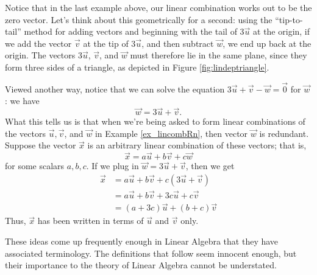 \medskip

Notice that in the last example above, our linear combination works out to be the zero vector. Let's think about this geometrically for a second: using the ``tip-to-tail'' method for adding vectors and beginning with the tail of $3\vec{u}$ at the origin, if we add the vector $\vec{v}$ at the tip of $3\vec{u}$, and then subtract $\vec{w}$, we end up back at the origin. The vectors $3\vec{u}$, $\vec{v}$, and $\vec{w}$ must therefore lie in the same plane, since they form three sides of a triangle, as depicted in Figure \ref{fig:lindeptriangle}.


Viewed another way, notice that we can solve the equation $3\vec{u}+\vec{v}-\vec{w}=\vec{0}$ for $\vec{w}$: we have
\[
\vec{w} = 3\vec{u}+\vec{v}.
\]
What this tells us is that when we're being asked to form linear combinations of the vectors $\vec{u}, \vec{v}$, and $\vec{w}$ in Example \ref{ex_lincombRn}, then vector $\vec{w}$ is redundant. Suppose the vector $\vec{x}$ is an arbitrary linear combination of these vectors; that is,
\[
\vec{x} = a\vec{u}+b\vec{v}+c\vec{w}
\]
for some scalars $a,b,c$. If we plug in $\vec{w} = 3\vec{u}+\vec{v}$, then we get
\begin{align*}
\vec{x} &= a\vec{u}+b\vec{v}+c(3\vec{u}+\vec{v})\\
& = a\vec{u}+b\vec{v}+3c\vec{u}+c\vec{v} \tag*{distribute the scalar}\\
& = (a+3c)\vec{u} + (b+c)\vec{v} \tag*{collect terms.}
\end{align*}
Thus, $\vec{x}$ has been written in terms of $\vec{u}$ and $\vec{v}$ only.

These ideas come up frequently enough in Linear Algebra that they have associated terminology. The definitions that follow seem innocent enough, but their importance to the theory of Linear Algebra cannot be understated.

\smallskip


